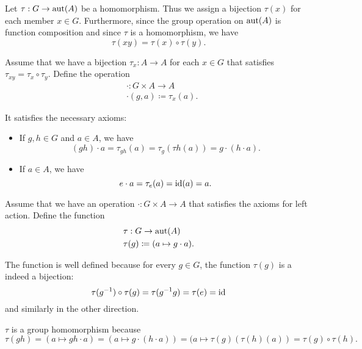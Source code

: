\begin{RefListProof}
     Let \( \tau: G \to \operatorname{aut}(A) \) be a homomorphism. Thus we assign a bijection \( \tau(x) \) for each member \( x \in G \). Furthermore, since the group operation on \( \operatorname{aut}(A) \) is function composition and since \( \tau \) is a homomorphism, we have
    \begin{equation*}
      \tau(xy) = \tau(x) \circ \tau(y).
    \end{equation*}

     Assume that we have a bijection \( \tau_x: A \to A \) for each \( x \in G \) that satisfies \( \tau_{xy} = \tau_x \circ \tau_y \). Define the operation
    \begin{align*}
      &\cdot: G \times A \to A \\
      &\cdot(g, a) \coloneqq \tau_x(a).
    \end{align*}

    It satisfies the necessary axioms:
    \begin{itemize}
      \item If \( g, h \in G \) and \( a \in A \), we have
      \begin{equation*}
        (g h) \cdot a
        =
        \tau_{g h}(a)
        =
        \tau_{g}(\tau{h}(a))
        =
        g \cdot (h \cdot a).
      \end{equation*}

      \item If \( a \in A \), we have
      \begin{equation*}
        e \cdot a
        =
        \tau_e(a)
        =
        \operatorname{id}(a)
        =
        a.
      \end{equation*}
    \end{itemize}

     Assume that we have an operation \( \cdot: G \times A \to A \) that satisfies the axioms for left action. Define the function
    \begin{align*}
      &\tau: G \to \operatorname{aut}(A) \\
      &\tau(g) \coloneqq (a \mapsto g \cdot a).
    \end{align*}

    The function is well defined because for every \( g \in G \), the function \( \tau(g) \) is a indeed a bijection:
    \begin{equation*}
      \tau(g^{-1}) \circ \tau(g)
      =
      \tau(g^{-1} g)
      =
      \tau(e)
      =
      \operatorname{id}
    \end{equation*}
    and similarly in the other direction.

    \( \tau \) is a group homomorphism because
    \begin{equation*}
      \tau(g h)
      =
      (a \mapsto gh \cdot a)
      =
      (a \mapsto g \cdot (h \cdot a))
      =
      (a \mapsto \tau(g)(\tau(h)(a))
      =
      \tau(g) \circ \tau(h).
    \end{equation*}
\end{RefListProof}

